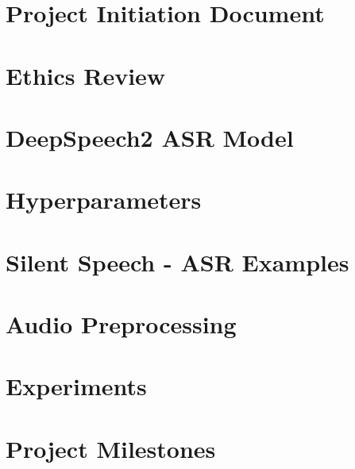\appendix


\chapter{Project Initiation Document}




\chapter{Ethics Review}



\chapter{DeepSpeech2 ASR Model}



\chapter{Hyperparameters}



\chapter{Silent Speech - ASR Examples}



\chapter{Audio Preprocessing}



\chapter{Experiments}



\chapter{Project Milestones}
\label{appendix:milestones}

